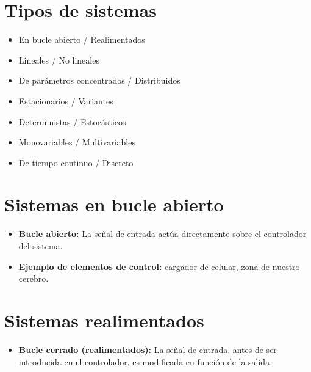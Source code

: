 \documentclass[a4paper,12pt,numbers=noenddot]{scrreprt}
\begin{document}
\section*{Tipos de sistemas}
\begin{itemize}
    \item {En bucle abierto / Realimentados}
    \item {Lineales / No lineales}
    \item {De parámetros concentrados / Distribuidos}
    \item {Estacionarios / Variantes}
    \item {Deterministas / Estocásticos}
    \item {Monovariables / Multivariables}
    \item {De tiempo continuo / Discreto}
\end{itemize}

\section*{Sistemas en bucle abierto}
\begin{itemize}
    \item \textbf{Bucle abierto:} La señal de entrada actúa directamente
    sobre el controlador del sistema.
    \item[] \textbf{Ejemplo de elementos de control:} cargador de celular,
    zona de nuestro cerebro.
\end{itemize}


\begin{center}
\end{center}

\section*{Sistemas realimentados}
\begin{itemize}
    \item \textbf{Bucle cerrado (realimentados):} La señal de entrada, antes de ser
    introducida en el controlador, es modificada en función de la salida.
\end{itemize}
\end{document}
